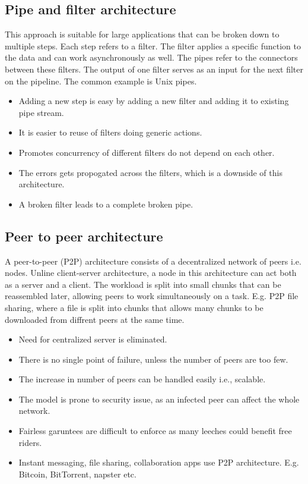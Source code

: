 \documentclass[conference]{IEEEtran}
\begin{document}
\subsection{Pipe and filter architecture} 
This approach is suitable for large applications that can be broken down to multiple steps. Each step refers to a filter. The filter applies a specific function to the data and can work asynchronously as well. The pipes refer to the connectors between these filters. The output of one filter serves as an input for the next filter on the pipeline. The common example is Unix pipes. 
\begin{itemize}
\item Adding a new step is easy by adding a new filter and adding it to existing pipe stream.
\item It is easier to reuse of filters doing generic actions.
\item Promotes concurrency of different filters do not depend on each other.
\item The errors gets propogated across the filters, which is a downside of this architecture.
\item A broken filter leads to a complete broken pipe.
\end{itemize}

\subsection{Peer to peer architecture}
A peer-to-peer (P2P) architecture consists of a decentralized network of peers i.e. nodes. Unline client-server architecture, a node in this architecture can act both as a server and a client.
The workload is split into small chunks that can be reassembled later, allowing peers to work simultaneously on a task. E.g. P2P file sharing, where a file is split into chunks that allows many chunks to be downloaded from diffrent peers at the same time.
\begin{itemize}
\item Need for centralized server is eliminated.
\item There is no single point of failure, unless the number of peers are too few.
\item The increase in number of peers can be handled easily i.e., scalable.
\item The model is prone to security issue, as an infected peer can affect the whole network.
\item Fairless garuntees are difficult to enforce as many leeches could benefit free riders.
\item Instant messaging, file sharing, collaboration apps use P2P architecture. E.g. Bitcoin, BitTorrent, napster etc.
\end{itemize}
\end{document}
